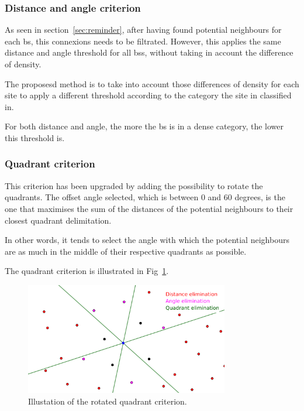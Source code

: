 \documentclass[lettersize,journal,english]{IEEEtran}
\begin{document}
        \subsubsection{Distance and angle criterion}
            As seen in section~\ref{sec:reminder}, after having found potential neighbours for each \acrshort{bs}, this connexions needs to be filtrated. However, this applies the same distance and angle threshold for all \acrshort{bs}s, without taking in account the difference of density.

            The proposesd method is to take into account those differences of density for each site to apply a different threshold according to the category the site in classified in.

            For both distance and angle, the more the \acrshort{bs} is in a dense category, the lower this threshold is.

        \subsubsection{Quadrant criterion}
            This criterion has been upgraded by adding the possibility to rotate the quadrants. The offset angle selected, which is between $0$ and $60$ degrees, is the one that maximises the sum of the distances of the potential neighbours to their closest quadrant delimitation.

            In other words, it tends to select the angle with which the potential neighbours are as much in the middle of their respective quadrants as possible.

            The quadrant criterion is illustrated in Fig~\ref{fig:crit_qua}.
            \begin{figure}
                \centering
                \includegraphics[width=3.5in]{images/illus_crit/quadrant_elim.png}
                \caption{Illustation of the rotated quadrant criterion.}
                \label{fig:crit_qua}
            \end{figure}
\end{document}
